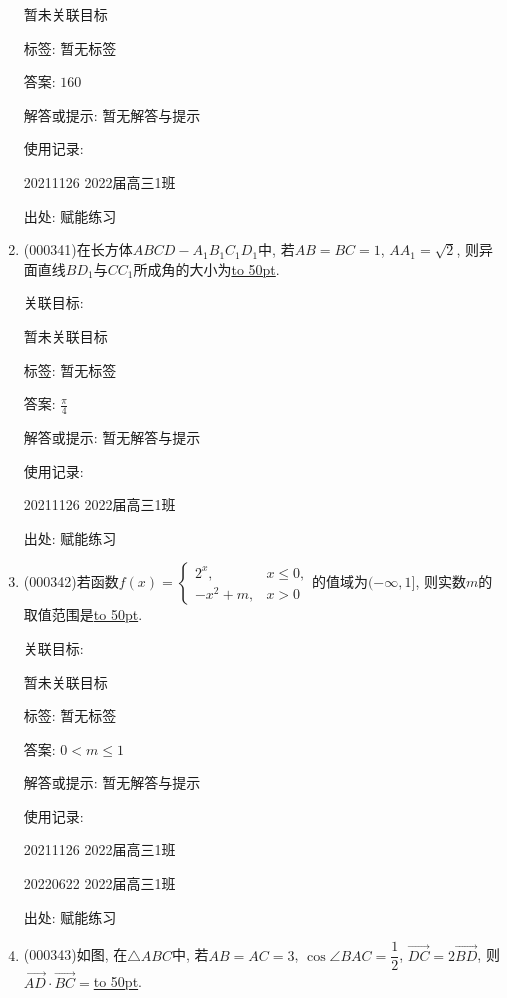 \documentclass[10pt,a4paper]{article}
\newcommand{\blank}[1]{\underline{\hbox to #1pt{}}}
\begin{document}
\begin{enumerate}[1.]
暂未关联目标



标签: 暂无标签

答案: $160$

解答或提示: 暂无解答与提示

使用记录:

20211126	2022届高三1班	


出处: 赋能练习
\item { (000341)}在长方体$ABCD-A_1B_1C_1D_1$中, 若$AB=BC=1$, $AA_1=\sqrt{2}$, 则异面直线$BD_1$与$CC_1$所成角的大小为\blank{50}.


关联目标:

暂未关联目标



标签: 暂无标签

答案: $\frac{\pi }4$

解答或提示: 暂无解答与提示

使用记录:

20211126	2022届高三1班	


出处: 赋能练习
\item { (000342)}若函数$f(x)=\begin{cases}    2^x, & x\le 0, \\ -x^2+m, & x>0 \end{cases}$的值域为$(-\infty ,1]$, 则实数$m$的取值范围是\blank{50}.


关联目标:

暂未关联目标



标签: 暂无标签

答案: $0<m\le 1$

解答或提示: 暂无解答与提示

使用记录:

20211126	2022届高三1班	

20220622	2022届高三1班  	


出处: 赋能练习
\item { (000343)}如图, 在$\triangle ABC$中, 若$AB=AC=3$, $\cos \angle BAC=\dfrac{1}{2}$, $\overrightarrow{DC}=2\overrightarrow{BD}$, 则$\overrightarrow{AD}\cdot \overrightarrow{BC}=$\blank{50}.
\begin{center}
\end{center}



\end{enumerate}
\end{document}
